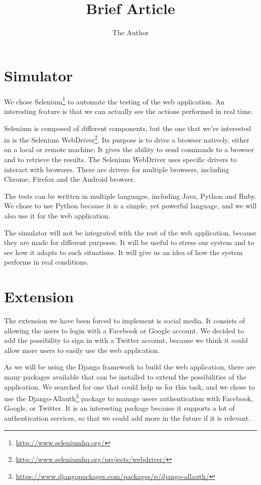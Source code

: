 \documentclass[11pt, a4paper]{article}   	%
\title{Brief Article}
\author{The Author}
\begin{document}

\section{Simulator}

We chose Selenium\footnote{\url{http://www.seleniumhq.org/}} to automate the testing of the web application.
An interesting feature is that we can actually see the actions performed in real time.

Selenium is composed of different components, but the one that we're interested in is the Selenium WebDriver\footnote{\url{http://www.seleniumhq.org/projects/webdriver/}}. %
Its purpose is to drive a browser natively, either on a local or remote machine.
It gives the ability to send commands to a browser and to retrieve the results.
The Selenium WebDriver uses specific drivers to interact with browsers.
There are drivers for multiple browsers, including Chrome, Firefox and the Android browser.

\medskip
The tests can be written in multiple languages, including Java, Python and Ruby.
We chose to use Python because it is a simple, yet powerful language, and we will also use it for the web application.

\medskip
The simulator will not be integrated with the rest of the web application, because they are made for different purposes.
It will be useful to stress our system and to see how it adapts to such situations.
It will give us an idea of how the system performs in real conditions.


\section{Extension}

The extension we have been forced to implement is social media.
It consists of allowing the users to login with a Facebook or Google account.
We decided to add the possibility to sign in with a Twitter account, because we think it could allow more users to easily use the web application.

\medskip
As we will be using the Django framework to build the web application, there are many packages available that can be installed to extend the possibilities of the application.
We searched for one that could help us for this task, and we chose to use the Django-Allauth\footnote{\url{https://www.djangopackages.com/packages/p/django-allauth/}} package to manage users authentication with Facebook, Google, or Twitter.
It is an interesting package because it supports a lot of authentication services, so that we could add more in the future if it is relevant.
\end{document}
